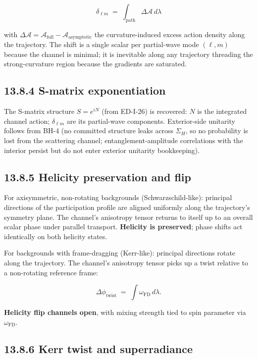 \documentclass[11pt]{book}
\begin{document}
\[
\delta_{\ell m} \;=\; \int_\mathrm{path} \Delta\mathcal{A}\,d\lambda
\]

with $\Delta\mathcal{A} = \mathcal{A}_\mathrm{full} - \mathcal{A}_\mathrm{asymptotic}$ the curvature-induced excess action density along the trajectory. The shift is a single scalar per partial-wave mode $(\ell, m)$ because the channel is minimal; it is inevitable along any trajectory threading the strong-curvature region because the gradients are saturated.

\subsection{13.8.4 S-matrix exponentiation}

The S-matrix structure $S = e^{iN}$ (from ED-I-26) is recovered: $N$ is the integrated channel action; $\delta_{\ell m}$ are its partial-wave components. Exterior-side unitarity follows from BH-4 (no committed structure leaks across $\Sigma_H$, so no probability is lost from the scattering channel; entanglement-amplitude correlations with the interior persist but do not enter exterior unitarity bookkeeping).

\subsection{13.8.5 Helicity preservation and flip}

For axisymmetric, non-rotating backgrounds (Schwarzschild-like): principal directions of the participation profile are aligned uniformly along the trajectory's symmetry plane. The channel's anisotropy tensor returns to itself up to an overall scalar phase under parallel transport. \textbf{Helicity is preserved}; phase shifts act identically on both helicity states.

For backgrounds with frame-dragging (Kerr-like): principal directions rotate along the trajectory. The channel's anisotropy tensor picks up a twist relative to a non-rotating reference frame:

\[
\Delta\phi_\mathrm{twist} \;=\; \int \omega_\mathrm{FD}\,d\lambda.
\]

\textbf{Helicity flip channels open}, with mixing strength tied to spin parameter via $\omega_\mathrm{FD}$.

\subsection{13.8.6 Kerr twist and superradiance}
\end{document}
